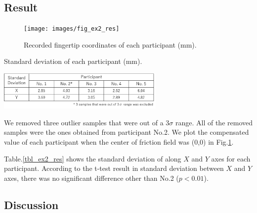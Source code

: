\subsection{Result}

\begin{figure}[h]
  \centering
  \texttt{[image: images/fig\_ex2\_res]}
  \caption{Recorded fingertip coordinates of each participant (mm).}
  \label{fig_ex2_res}
\end{figure}

\begin{table}[h]
  \centering
  \caption{Standard deviation of each participant (mm).}  
  \includegraphics[width=3.2in]{images/tbl_ex2_res}
  \label{tbl_ex2_res}
\end{table}

We removed three outlier samples that were out of a 3$\sigma$ range.
All of the removed samples were the ones obtained from participant No.2.
We plot the compensated value of each participant when the center of friction field was (0,0) in Fig.\ref{fig_ex2_res}.


Table.\ref{tbl_ex2_res} shows the standard deviation of along $X$ and $Y$ axes for each participant. 
According to the t-test result in standard deviation between $X$ and $Y$ axes, there was no significant difference other than No.2 ($p<0.01$).

\subsection{Discussion}

